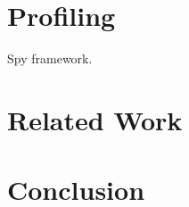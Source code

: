 \documentclass[runningheads]{llncs}
\begin{document}
\section{Profiling}


Spy framework.



\section{Related Work}


\section{Conclusion}


{\small


}
\end{document}
